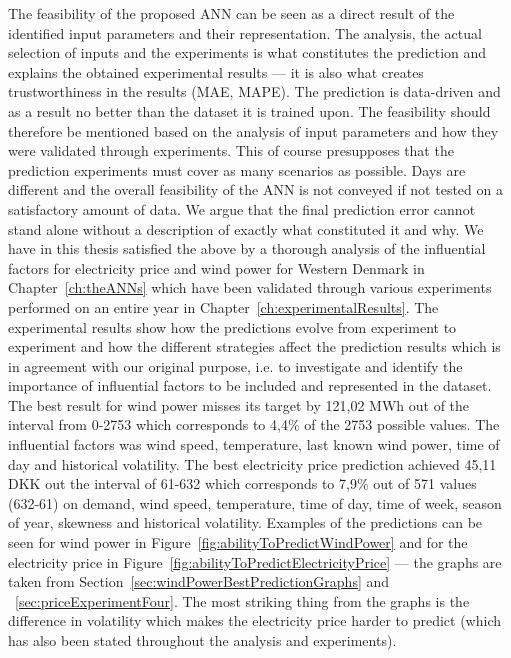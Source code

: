 The feasibility of the proposed ANN can be seen as a direct result of the identified input parameters and their representation. The analysis, the actual selection of inputs and the experiments is what constitutes the prediction and explains the obtained experimental results --- it is also what creates trustworthiness in the results (MAE, MAPE). The prediction is data-driven and as a result no better than the dataset it is trained upon. The feasibility should therefore be mentioned based on the analysis of input parameters and how they were validated through experiments. This of course presupposes that the prediction experiments must cover as many scenarios as possible. Days are different and the overall feasibility of the ANN is not conveyed if not tested on a satisfactory amount of data. We argue that the final prediction error cannot stand alone without a description of exactly what constituted it and why. We have in this thesis satisfied the above by a thorough analysis of the influential factors for electricity price and wind power for Western Denmark in Chapter~\ref{ch:theANNs} which have been validated through various experiments performed on an entire year in Chapter~\ref{ch:experimentalResults}. The experimental results show how the predictions evolve from experiment to experiment and how the different strategies affect the prediction results which is in agreement with our original purpose, i.e. to investigate and identify the importance of influential factors to be included and represented in the dataset. The best result for wind power misses its target by 121,02 MWh out of the interval from 0-2753 which corresponds to 4,4\% of the 2753 possible values. The influential factors was wind speed, temperature, last known wind power, time of day and historical volatility. The best electricity price prediction achieved 45,11 DKK out the interval of 61-632 which corresponds to 7,9\% out of 571 values (632-61) on demand, wind speed, temperature, time of day, time of week, season of year, skewness and historical volatility. Examples of the predictions can be seen for wind power in Figure~\ref{fig:abilityToPredictWindPower} and for the electricity price in Figure~\ref{fig:abilityToPredictElectricityPrice} --- the graphs are taken from Section~\ref{sec:windPowerBestPredictionGraphs} and ~\ref{sec:priceExperimentFour}. The most striking thing from the graphs is the difference in volatility which makes the electricity price harder to predict (which has also been stated throughout the analysis and experiments).

